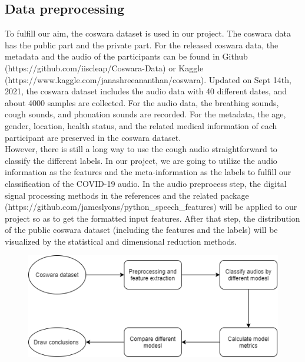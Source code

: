 \documentclass[11pt]{article}
\begin{document}
\subsection{Data preprocessing}
To fulfill our aim, the coswara dataset\cite{sharma2020coswara} is used in our project. The coswara data has the public part and the private part. For the released coswara data, the metadata and the audio of the participants can be found in Github (https://github.com/iiscleap/Coswara-Data) or Kaggle 
(https://www.kaggle.com/janashreeananthan/coswara). Updated on Sept 14th, 2021, the coswara 
dataset includes the audio data with 40 different dates, and about 4000 samples are collected. 
For the audio data, the breathing sounds, cough sounds, and phonation sounds are recorded. 
For the metadata, the age, gender, location, health status, and the related medical information of each participant are preserved in the coswara dataset.\\

\noindent
However, there is still a long way to use the cough audio straightforward to classify the different labels. In our project, we are going to utilize the audio information as the 
features and the meta-information as the labels to fulfill our classification of the COVID-19 
audio. In the audio preprocess step, the digital signal processing methods in the references\cite{mohammed2021ensemble} and the related package (https://github.com/jameslyons/python\_speech\_features) will be applied to our project so as to get the formatted input features. After that step, the distribution of the public coswara dataset (including the features and the labels) will be visualized by the statistical and dimensional reduction methods.  \\
\begin{figure}[htbp]
    \centering
    \includegraphics[width=.8\textwidth]{jiabao.png} %
    \label{fig_methyltech}
 \end{figure}
\end{document}
